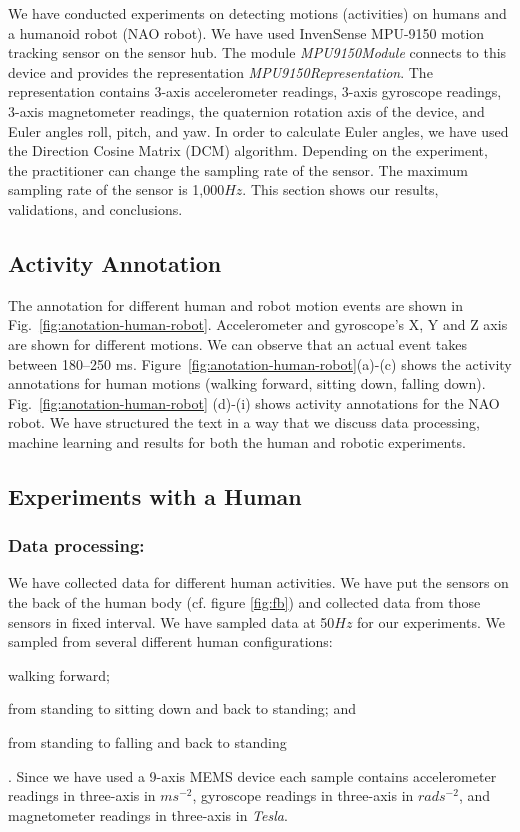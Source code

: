 \documentclass[letterpaper]{article}
\begin{document}
We have conducted experiments on detecting motions (activities) on 
humans and a humanoid robot (NAO robot). We have used InvenSense MPU-9150 
motion tracking sensor on the sensor hub. The module {\em MPU9150Module} connects to this device
and provides the representation {\em MPU9150Representation}. The representation contains
3-axis accelerometer readings, 3-axis gyroscope readings, 3-axis magnetometer readings, the quaternion
rotation axis of the device, and Euler angles roll, pitch, and yaw.  In order to calculate Euler
angles, we have used the Direction Cosine Matrix (DCM) algorithm.  Depending on the
experiment, the practitioner can change the sampling rate of the sensor.  The maximum sampling rate
of the sensor is 1,000$Hz$. This section shows our results, validations, and conclusions.


\subsection{Activity Annotation}

The annotation for different human and robot motion events are shown in Fig.{~\ref{fig:anotation-human-robot}}. 
Accelerometer and gyroscope's X, Y and Z axis are shown for different motions. We can observe that an 
actual event takes between 180--250 ms. Figure{~\ref{fig:anotation-human-robot}}(a)-(c) shows the activity 
annotations for human motions (walking forward, sitting down, falling down). Fig.{~\ref{fig:anotation-human-robot}}
(d)-(i) shows activity annotations for the NAO robot. We have structured the text in a way that we discuss 
data processing, machine learning and results for both the human and robotic experiments.

\subsection{Experiments with a Human}
\subsubsection{Data processing:} 
We have collected data for different human activities. We have put the sensors on the back of the
human body (cf. figure \ref{fig:fb}) and collected data from those sensors in fixed interval. 
We have sampled data at 50$Hz$ for our experiments. We sampled from several different human configurations:
\begin{inparaenum}[(1)] \item walking forward; \item from standing to sitting down and back to standing;
and \item from standing to falling and back to standing\end{inparaenum}. Since we have used a 9-axis MEMS device 
each sample contains accelerometer readings in three-axis in $ms^{-2}$, gyroscope readings in 
three-axis in $rads^{-2}$, and magnetometer readings in three-axis in {\em Tesla}. 
\end{document}
